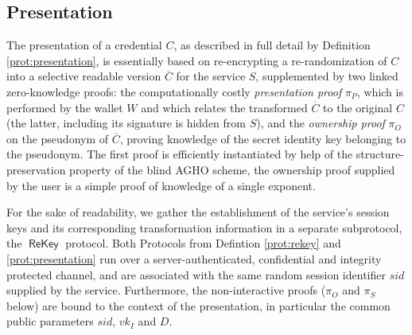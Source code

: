 \documentclass[runningheads]{llncs}
\DeclareMathOperator{\rekey}{\mathsf{ReKey}}
\begin{document}
\subsection{Presentation}

The presentation of a credential $C$, as described in full detail by Definition \ref{prot:presentation}, is essentially based on re-encrypting a re-randomization of $C$ into a selective readable version $\overline C$ for the service $S$, supplemented by two linked zero-knowledge proofs:
the computationally costly \emph{presentation proof} $\pi_P$, which is performed by the wallet $W$ and which relates the transformed $\overline C$ to the original $C$ (the latter, including its signature is hidden from $S$),  and  the \emph{ownership proof} $\pi_O$ on the pseudonym of $\overline C$, proving knowledge of the secret identity key belonging to the pseudonym.
The first proof is efficiently  instantiated by help of the structure-preservation property of the blind AGHO scheme, the ownership proof supplied by the user is a simple proof of knowledge of a 
 single exponent. 



For the sake of readability, we gather the establishment of the service's session keys  and its corresponding transformation information in a separate subprotocol, the $\rekey$ protocol. 
Both Protocols from Defintion \ref{prot:rekey} and  \ref{prot:presentation} run over a server-authenticated, confidential and integrity protected channel, and are associated with the same random session identifier $sid$ supplied by the service.
Furthermore, the non-interactive proofs ($\pi_O$ and $\pi_S$ below) are bound to the context of the presentation, in particular the common public parameters $sid$, $vk_I$ and $D$.
\end{document}
